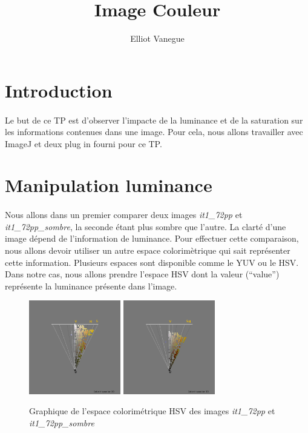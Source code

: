 \documentclass[a4paper,10pt]{article}
\title{Image Couleur}
\author{Elliot Vanegue}
\begin{document}
\maketitle
\section{Introduction}
\paragraph{}Le but de ce TP est d'observer l'impacte de la luminance et de la saturation sur les informations
contenues dans une image. Pour cela, nous allons travailler avec ImageJ et deux plug in fourni pour
ce TP.

\section{Manipulation luminance}
\paragraph{}Nous allons dans un premier comparer deux images \textit{it1\_72pp} et \textit{it1\_72pp\_sombre}, la seconde étant plus sombre que l'autre.
La clarté d'une image dépend de l'information de luminance.
Pour effectuer cette comparaison, nous allons devoir utiliser un autre espace colorimètrique qui
sait représenter cette information. Plusieurs espaces sont disponible comme le YUV ou le HSV.
Dans notre cas, nous allons prendre l'espace HSV dont la valeur (\enquote{value}) représente 
la luminance présente dans l'image.\\

\begin{figure}[!h]
 \begin{center}
 \includegraphics[width=4cm]{resultat/luminance1.png}
 \includegraphics[width=4cm]{resultat/luminance2.png}
 \caption{Graphique de l'espace colorimétrique HSV des images \textit{it1\_72pp} et \textit{it1\_72pp\_sombre}}
 \end{center}
\end{figure}
\end{document}
